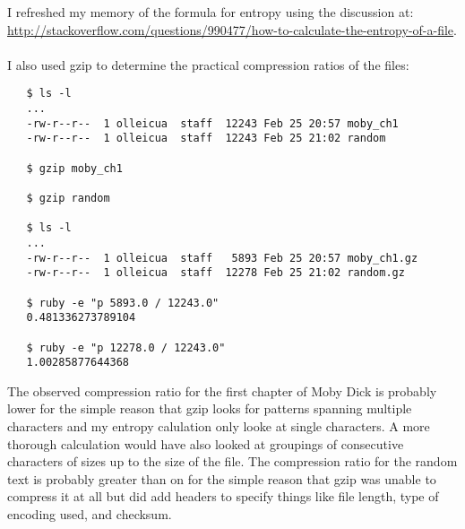 \documentclass[11pt]{article}
\begin{document}
  
  \noindent
  I refreshed my memory of the formula for entropy using the
  discussion at:
  \href{http://stackoverflow.com/questions/990477/how-to-calculate-the-entropy-of-a-file}{http://stackoverflow.com/questions/990477/how-to-calculate-the-entropy-of-a-file}. \\
  \\
  \noindent
  I also used gzip to determine the practical compression ratios of
  the files:
  
\begin{verbatim}
   $ ls -l
   ...
   -rw-r--r--  1 olleicua  staff  12243 Feb 25 20:57 moby_ch1
   -rw-r--r--  1 olleicua  staff  12243 Feb 25 21:02 random
   
   $ gzip moby_ch1
   
   $ gzip random
   
   $ ls -l
   ...
   -rw-r--r--  1 olleicua  staff   5893 Feb 25 20:57 moby_ch1.gz
   -rw-r--r--  1 olleicua  staff  12278 Feb 25 21:02 random.gz
   
   $ ruby -e "p 5893.0 / 12243.0"
   0.481336273789104
   
   $ ruby -e "p 12278.0 / 12243.0"
   1.00285877644368
\end{verbatim}


  \noindent
  The observed compression ratio for the first chapter of Moby Dick is
  probably lower for the simple reason that gzip looks for patterns
  spanning multiple characters and my entropy calulation only looke at
  single characters.  A more thorough calculation would have also
  looked at groupings of consecutive characters of sizes up to the
  size of the file.  The compression ratio for the random text is
  probably greater than on for the simple reason that gzip was unable
  to compress it at all but did add headers to specify things like
  file length, type of encoding used, and checksum.
\end{document}
